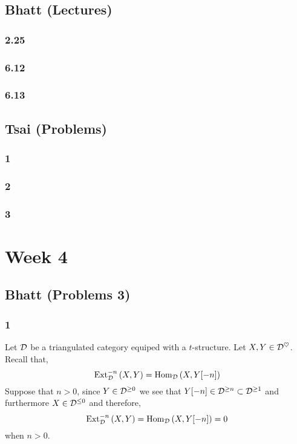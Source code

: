 \documentclass[12pt]{article}
\newcommand{\heart}{\ensuremath\heartsuit}
\begin{document}
\subsection{Bhatt (Lectures)}

\subsubsection*{2.25}

\subsubsection*{6.12}

\subsubsection*{6.13}

\subsection{Tsai (Problems)}

\subsubsection*{1}

\subsubsection*{2}

\subsubsection*{3}

\section{Week 4}

\subsection{Bhatt (Problems 3)}

\subsubsection*{1}


Let $\mathcal{D}$ be a triangulated category equiped with a $t$-structure. Let $X, Y \in \D^{\heart}$. Recall that,
\[ \mathrm{Ext}^{-n}_{\mathcal{D}} \left( X, Y \right) = \mathrm{Hom}_{\mathcal{D}} \left( X, Y[-n] \right) \]
Suppose that $n > 0$, since $Y \in \mathcal{D}^{\ge 0}$ we see that $Y[-n] \in \mathcal{D}^{\ge n} \subset \mathcal{D}^{\ge 1}$ and furthermore $X \in \mathcal{D}^{\le 0}$ and therefore,
\[ \mathrm{Ext}^{-n}_{\mathcal{D}} \left( X, Y \right) = \mathrm{Hom}_{\mathcal{D}} \left( X, Y[-n] \right) = 0 \]
when $n > 0$.
\end{document}
